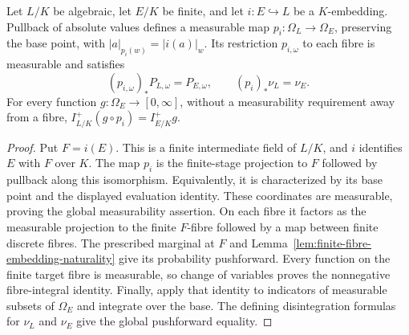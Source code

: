 \begin{lemma}
\label{lem:algebraic-finite-embedding-projection}
\leanok
{}
Let $L/K$ be algebraic, let $E/K$ be finite, and let
$i:E\hookrightarrow L$ be a $K$-embedding. Pullback of absolute values
defines a measurable map $p_i:\Omega_L\to\Omega_E$, preserving the
base point, with $|a|_{p_i(w)}=|i(a)|_w$. Its restriction $p_{i,\omega}$
to each fibre is measurable and satisfies
\[
 (p_{i,\omega})_*P_{L,\omega}=P_{E,\omega},\qquad
 (p_i)_*\nu_L=\nu_E.
\]
For every function $g:\Omega_E\to[0,\infty]$, without a measurability
requirement away from a fibre,
$I^+_{L/K}(g\circ p_i)=I^+_{E/K}g$.
\end{lemma}
\begin{proof}
Put $F=i(E)$. This is a finite intermediate field of $L/K$, and $i$
identifies $E$ with $F$ over $K$. The map $p_i$ is the finite-stage
projection to $F$ followed by pullback along this isomorphism.
Equivalently, it is characterized by its base point and the displayed
evaluation identity. These coordinates are measurable, proving the
global measurability assertion. On each fibre it factors as the
measurable projection to the finite $F$-fibre followed by a map between
finite discrete fibres. The prescribed marginal at $F$ and
Lemma~\ref{lem:finite-fibre-embedding-naturality} give its probability
pushforward. Every function on the finite target fibre is measurable,
so change of variables proves the nonnegative fibre-integral identity.
Finally, apply that identity to indicators of measurable subsets of
$\Omega_E$ and integrate over the base. The defining disintegration
formulas for $\nu_L$ and $\nu_E$ give the global pushforward equality.
\end{proof}

